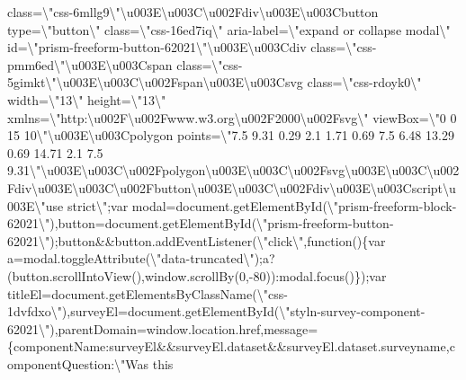 class=\textbackslash{}"css-6mllg9\textbackslash{}"\textbackslash{}u003E\textbackslash{}u003C\textbackslash{}u002Fdiv\textbackslash{}u003E\textbackslash{}u003Cbutton
type=\textbackslash{}"button\textbackslash{}"
class=\textbackslash{}"css-16ed7iq\textbackslash{}"
aria-label=\textbackslash{}"expand or collapse modal\textbackslash{}"
id=\textbackslash{}"prism-freeform-button-62021\textbackslash{}"\textbackslash{}u003E\textbackslash{}u003Cdiv
class=\textbackslash{}"css-pmm6ed\textbackslash{}"\textbackslash{}u003E\textbackslash{}u003Cspan
class=\textbackslash{}"css-5gimkt\textbackslash{}"\textbackslash{}u003E\textbackslash{}u003C\textbackslash{}u002Fspan\textbackslash{}u003E\textbackslash{}u003Csvg
class=\textbackslash{}"css-rdoyk0\textbackslash{}"
width=\textbackslash{}"13\textbackslash{}"
height=\textbackslash{}"13\textbackslash{}"
xmlns=\textbackslash{}"http:\textbackslash{}u002F\textbackslash{}u002Fwww.w3.org\textbackslash{}u002F2000\textbackslash{}u002Fsvg\textbackslash{}"
viewBox=\textbackslash{}"0 0 15
10\textbackslash{}"\textbackslash{}u003E\textbackslash{}u003Cpolygon
points=\textbackslash{}"7.5 9.31 0.29 2.1 1.71 0.69 7.5 6.48 13.29 0.69
14.71 2.1 7.5
9.31\textbackslash{}"\textbackslash{}u003E\textbackslash{}u003C\textbackslash{}u002Fpolygon\textbackslash{}u003E\textbackslash{}u003C\textbackslash{}u002Fsvg\textbackslash{}u003E\textbackslash{}u003C\textbackslash{}u002Fdiv\textbackslash{}u003E\textbackslash{}u003C\textbackslash{}u002Fbutton\textbackslash{}u003E\textbackslash{}u003C\textbackslash{}u002Fdiv\textbackslash{}u003E\textbackslash{}u003Cscript\textbackslash{}u003E\textbackslash{}"use
strict\textbackslash{}";var
modal=document.getElementById(\textbackslash{}"prism-freeform-block-62021\textbackslash{}"),button=document.getElementById(\textbackslash{}"prism-freeform-button-62021\textbackslash{}");button\&\&button.addEventListener(\textbackslash{}"click\textbackslash{}",function()\{var
a=modal.toggleAttribute(\textbackslash{}"data-truncated\textbackslash{}");a?(button.scrollIntoView(),window.scrollBy(0,-80)):modal.focus()\});var
titleEl=document.getElementsByClassName(\textbackslash{}"css-1dvfdxo\textbackslash{}"),surveyEl=document.getElementById(\textbackslash{}"styln-survey-component-62021\textbackslash{}"),parentDomain=window.location.href,message=\{componentName:surveyEl\&\&surveyEl.dataset\&\&surveyEl.dataset.surveyname,componentQuestion:\textbackslash{}"Was
this
